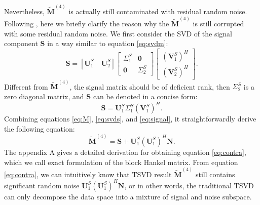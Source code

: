 Nevertheless, $\tilde{\mathbf{M}}^{(4)}$ is actually still contaminated  with residual random noise. Following \cite{weilin}, here we briefly clarify the reason why the $\tilde{\mathbf{M}}^{(4)}$ is still corrupted with some residual random noise. We first consider the SVD of the signal component $\mathbf{S}$ in a way similar to equation \ref{eq:svdm}: 
\begin{equation}
\label{eq:svds}
\mathbf{S} = [\mathbf{U}_1^{S}\quad \mathbf{U}_2^{S}]\left[\begin{array}{cc}
\Sigma_1^{S} & \mathbf{0}\\
\mathbf{0} & \Sigma_2^{S}
\end{array}
\right]\left[\begin{array}{c}
(\mathbf{V}_1^{S})^H\\
(\mathbf{V}_2^{S})^H
\end{array}
\right].
\end{equation}
Different from $\tilde{\mathbf{M}}^{(4)}$, the signal matrix should be of deficient rank, then $\Sigma_2^S$ is a zero diagonal matrix, and $\mathbf{S}$ can be denoted in a concise form:
\begin{equation}
\label{eq:signal}
\mathbf{S}=\mathbf{U}_1^S\Sigma_1^S(\mathbf{V}_1^S)^H.
\end{equation}
Combining equations \ref{eq:M}, \ref{eq:svds}, and \ref{eq:signal}, it straightforwardly derive the following equation:
\begin{equation}
\label{eq:contra}
\tilde{\mathbf{M}}^{(4)} = \mathbf{S} + \mathbf{U}_1^S(\mathbf{U}_1^S)^H\mathbf{N}.
\end{equation}
The appendix A gives a detailed derivation for obtaining equation \ref{eq:contra}, which we call exact formulation of the block Hankel matrix. From equation \ref{eq:contra}, we can intuitively know that TSVD result $\tilde{\mathbf{M}}^{(4)}$ still contains significant random noise $\mathbf{U}_1^S(\mathbf{U}_1^S)^H\mathbf{N}$, or in other words, the traditional TSVD can only decompose the data space into a mixture of signal and noise subspace. 

